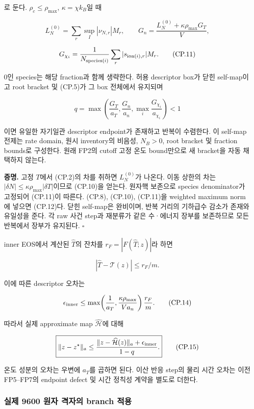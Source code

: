 \documentclass[11pt,a4paper]{article}
\begin{document}
로 둔다. \(\rho_c\le\rho_{\max}\), \(\kappa=\chi k_B\)일 때

\[
L_N^{(0)}=\sum_r\sup_I|\nu_{N,r}|M_r,\qquad
G_n=\frac{L_N^{(0)}+\kappa\rho_{\max}G_T}{V},
\tag{CP.10}
\]

\[
G_{\chi_i}=\frac1{N_{{\rm species}(i)}}\sum_r|s_{{\rm ion}(i),r}|M_r.
\tag{CP.11}
\]

0인 species는 해당 fraction과 함께 생략한다. 허용 descriptor box가 닫힌 self-map이고 root bracket 및 (CP.5)가 그 box 전체에서 유지되며

\[
\boxed{q=\max\left(\frac{G_T}{a_T},\frac{G_n}{a_n},
\max_i\frac{G_{\chi_i}}{a_{\chi_i}}\right)<1}
\tag{CP.12}
\]

이면 유일한 자기일관 descriptor endpoint가 존재하고 반복이 수렴한다. 이 self-map 전제는 rate domain, 원시 inventory의 비음성, \(N_B>0\), root bracket 및 fraction bounds로 구성한다. 원래 FP2의 cutoff 고정 온도 bound만으로 새 bracket을 자동 채택하지 않는다.

\textbf{증명.} 고정 \(T\)에서 (CP.2)의 차를 취하면 \(L_N^{(0)}\)가 나온다. 이동 상한의 차는 \(|\delta N|\le\kappa\rho_{\max}|\delta T|\)이므로 (CP.10)을 얻는다. 원자핵 보존으로 species denominator가 고정되어 (CP.11)이 따른다. (CP.8), (CP.10), (CP.11)을 weighted maximum norm에 넣으면 (CP.12)다. 닫힌 self-map은 완비이며, 반복 거리의 기하급수 감소가 존재와 유일성을 준다. 각 raw 사건 step과 재분류가 같은 수·에너지 장부를 보존하므로 모든 반복에서 장부가 유지된다. \(\square\)

inner EOS에서 계산된 \(\widehat T\)의 잔차를 \(r_F=|F(\widehat T;z)|\)라 하면

\[
|\widehat T-\mathcal T(z)|\le r_F/m.
\tag{CP.13}
\]

이에 따른 descriptor 오차는

\[
\epsilon_{\rm inner}
\le \max\!\left(\frac1{a_T},\frac{\kappa\rho_{\max}}{Va_n}\right)\frac{r_F}{m}.
\tag{CP.14}
\]

따라서 실제 approximate map \(\widehat{\mathcal H}\)에 대해

\[
\boxed{\|z-z^\star\|_a\le
\frac{\|z-\widehat{\mathcal H}(z)\|_a+\epsilon_{\rm inner}}{1-q}.}
\tag{CP.15}
\]

온도 성분의 오차는 우변에 \(a_T\)를 곱하면 된다. 이산 반응 step의 물리 시간 오차는 이전 FP5--FP7의 endpoint defect 및 시간 정칙성 계약을 별도로 더한다.

\hypertarget{uxc2e4uxc81c-9600-uxc6d0uxc790-uxaca9uxc790uxc758-branch-uxc801uxc6a9}{%
\subsubsection{실제 9600 원자 격자의 branch 적용}\label{uxc2e4uxc81c-9600-uxc6d0uxc790-uxaca9uxc790uxc758-branch-uxc801uxc6a9}}
\end{document}
